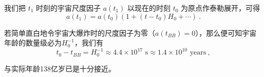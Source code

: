 我们把 $t_1$ 时刻的宇宙尺度因子 $a(t_1)$ 以现在的时刻 $t_0$ 为原点作泰勒展开，可得
\begin{equation}
a(t_1)=a(t_0)(1+(t-t_0)H_0+\cdots)~.
\end{equation}

若简单直白地令宇宙大爆炸时的尺度因子为零（$a(t_{BB})=0$），那么便可知宇宙年龄的数量级必为$H_0^{-1}$，我们有
\begin{equation}t_0-t_{BB}=H_0^{-1}\approx4.4\times10^{17}\text{ s}\approx1.4\times10^{10}\text{ years}~,\end{equation}

与实际年龄138亿岁已是十分接近。